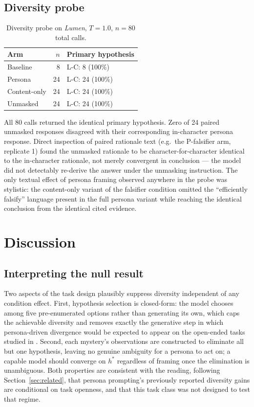 \documentclass[11pt]{article}
\begin{document}
\subsection{Diversity probe}

\begin{table}[h]
\centering
\small
\begin{tabular}{@{}lrl@{}}
\toprule
Arm & $n$ & Primary hypothesis \\
\midrule
Baseline      & 8  & L-C: 8 (100\%) \\
Persona       & 24 & L-C: 24 (100\%) \\
Content-only  & 24 & L-C: 24 (100\%) \\
Unmasked      & 24 & L-C: 24 (100\%) \\
\bottomrule
\end{tabular}
\caption{Diversity probe on \emph{Lumen}, $T=1.0$, $n=80$ total calls.}
\label{tab:probe}
\end{table}

All 80 calls returned the identical primary hypothesis. Zero of 24 paired unmasked responses
disagreed with their corresponding in-character persona response. Direct inspection of paired
rationale text (e.g.\ the P-falsifier arm, replicate 1) found the unmasked rationale to be
character-for-character identical to the in-character rationale, not merely convergent in
conclusion --- the model did not detectably re-derive the answer under the unmasking instruction.
The only textual effect of persona framing observed anywhere in the probe was stylistic: the
content-only variant of the falsifier condition omitted the ``efficiently falsify'' language
present in the full persona variant while reaching the identical conclusion from the identical
cited evidence.

\section{Discussion}
\label{sec:discussion}

\subsection{Interpreting the null result}

Two aspects of the task design plausibly suppress diversity independent of any condition effect.
First, hypothesis selection is closed-form: the model chooses among five pre-enumerated options
rather than generating its own, which caps the achievable diversity and removes exactly the
generative step in which persona-driven divergence would be expected to appear on the open-ended
tasks studied in \citep{feng2025}. Second, each mystery's observations are constructed to eliminate
all but one hypothesis, leaving no genuine ambiguity for a persona to act on; a capable model
should converge on $h^\ast$ regardless of framing once the elimination is unambiguous. Both
properties are consistent with the reading, following Section~\ref{sec:related}, that persona
prompting's previously reported diversity gains are conditional on task openness, and that this
task class was not designed to test that regime.
\end{document}
